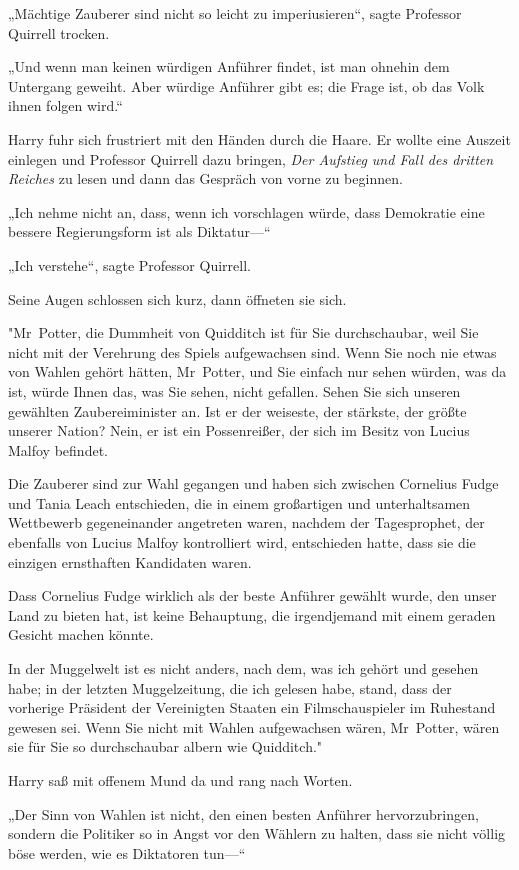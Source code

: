 {„Mächtige Zauberer sind nicht so leicht zu imperiusieren“, sagte Professor Quirrell trocken.

„Und wenn man keinen würdigen Anführer findet, ist man ohnehin dem Untergang geweiht. Aber würdige Anführer gibt es; die Frage ist, ob das Volk ihnen folgen wird.“

Harry fuhr sich frustriert mit den Händen durch die Haare. Er wollte eine Auszeit einlegen und Professor Quirrell dazu bringen, \emph{Der Aufstieg und Fall des dritten Reiches} zu lesen und dann das Gespräch von vorne zu beginnen.

„Ich nehme nicht an, dass, wenn ich vorschlagen würde, dass Demokratie eine bessere Regierungsform ist als Diktatur—“

„Ich verstehe“, sagte Professor Quirrell.

Seine Augen schlossen sich kurz, dann öffneten sie sich.

"Mr~Potter, die Dummheit von Quidditch ist für Sie durchschaubar, weil Sie nicht mit der Verehrung des Spiels aufgewachsen sind. Wenn Sie noch nie etwas von Wahlen gehört hätten, Mr~Potter, und Sie einfach nur sehen würden, was da ist, würde Ihnen das, was Sie sehen, nicht gefallen. Sehen Sie sich unseren gewählten Zaubereiminister an. Ist er der weiseste, der stärkste, der größte unserer Nation? Nein, er ist ein Possenreißer, der sich im Besitz von Lucius Malfoy befindet.

Die Zauberer sind zur Wahl gegangen und haben sich zwischen Cornelius Fudge und Tania Leach entschieden, die in einem großartigen und unterhaltsamen Wettbewerb gegeneinander angetreten waren, nachdem der Tagesprophet, der ebenfalls von Lucius Malfoy kontrolliert wird, entschieden hatte, dass sie die einzigen ernsthaften Kandidaten waren.

Dass Cornelius Fudge wirklich als der beste Anführer gewählt wurde, den unser Land zu bieten hat, ist keine Behauptung, die irgendjemand mit einem geraden Gesicht machen könnte.

In der Muggelwelt ist es nicht anders, nach dem, was ich gehört und gesehen habe; in der letzten Muggelzeitung, die ich gelesen habe, stand, dass der vorherige Präsident der Vereinigten Staaten ein Filmschauspieler im Ruhestand gewesen sei. Wenn Sie nicht mit Wahlen aufgewachsen wären, Mr~Potter, wären sie für Sie so durchschaubar albern wie Quidditch."

Harry saß mit offenem Mund da und rang nach Worten.

„Der Sinn von Wahlen ist nicht, den einen besten Anführer hervorzubringen, sondern die Politiker so in Angst vor den Wählern zu halten, dass sie nicht völlig böse werden, wie es Diktatoren tun—“

}

